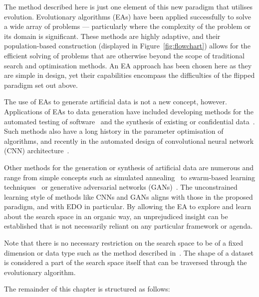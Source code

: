
The method described here is just one element of this new paradigm that utilises
evolution. Evolutionary algorithms (EAs) have been applied successfully to solve
a wide array of problems --- particularly where the complexity of the problem or
its domain is significant. These methods are highly adaptive, and their
population-based construction (displayed in Figure~\ref{fig:flowchart}) allows
for the efficient solving of problems that are otherwise beyond the scope of
traditional search and optimisation methods. An EA approach has been chosen here
as they are simple in design, yet their capabilities encompass the difficulties
of the flipped paradigm set out above.


The use of EAs to generate artificial data is not a new concept, however.
Applications of EAs to data generation have included developing methods for the
automated testing of software~\cite{Koleejan2015,Michael2001,Sharifipour2018}
and the synthesis of existing or confidential data~\cite{Chen2016synthetic}.
Such methods also have a long history in the parameter optimisation of
algorithms, and recently in the automated design of convolutional neural network
(CNN) architecture~\cite{Suganuma2017,Sun2018}.

Other methods for the generation or synthesis of artificial data are numerous
and range from simple concepts such as simulated annealing~\cite{Matejka2017} to
swarm-based learning techniques~\cite{Abualigah2018b} or generative adversarial
networks (GANs)~\cite{Goodfellow2014}. The unconstrained learning style of
methods like CNNs and GANs aligns with those in the proposed paradigm, and with
EDO in particular. By allowing the EA to explore and learn about the search
space in an organic way, an unprejudiced insight can be established that is not
necessarily reliant on any particular framework or agenda.

Note that there is no necessary restriction on the search space to be of a fixed
dimension or data type such as the method described in~\cite{Chen2016synthetic}.
The shape of a dataset is considered a part of the search space itself that can
be traversed through the evolutionary algorithm.

The remainder of this chapter is structured as follows:

